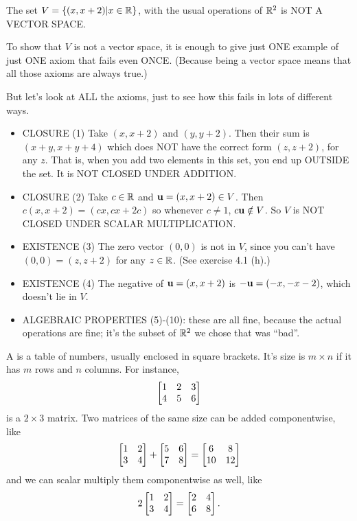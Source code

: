\begin{myexample} The set $V = \{(x,x+2) | x\in \mathbb{R}\}$, with the usual operations of $\mathbb{R}^2$ is NOT A VECTOR SPACE.

To show that $V$ is not a vector space, it is enough to give just ONE
example of just ONE axiom that fails even ONCE.  (Because being
a vector space means that all those axioms are always true.)

But let's look at ALL the axioms, just to see how this fails in 
lots of different ways.
\begin{itemize}
\item CLOSURE (1)  Take $(x,x+2)$ and $(y,y+2)$.  Then their sum is
$(x+y, x+y+4)$ which does NOT have the correct form $(z,z+2)$, for
any $z$.  That is, when you add two elements in this set, you end
up OUTSIDE the set.  It is NOT CLOSED UNDER ADDITION.
\item CLOSURE (2) Take $c\in \mathbb{R}$ and $\mathbf{u} = (x,x+2)\in V$.  Then $c(x,x+2) = (cx, cx+2c)$ so whenever $c\neq 1$, $c\mathbf{u} \notin V$.  So $V$ is
NOT CLOSED UNDER SCALAR MULTIPLICATION.
\item EXISTENCE (3) The zero vector $(0,0)$ is not in $V$, since 
you can't have $(0,0) = (z,z+2)$ for any $z\in \mathbb{R}$.  (See exercise 4.1 (h).)
\item EXISTENCE (4) The negative of $\mathbf{u} = (x,x+2)$ is $-\mathbf{u} = (-x,-x-2)$,
which doesn't lie in $V$.
\item ALGEBRAIC PROPERTIES (5)-(10): these are all fine, because the
actual operations are fine; it's the subset of $\mathbb{R}^2$ we chose 
that was ``bad''.
\end{itemize} \end{myexample}


\begin{definition}
A  is a table of numbers, usually enclosed in
square brackets.  It's size is $m \times n$ if it has $m$ rows and
$n$ columns.  For instance, 
$$\left[ \begin{matrix} 1 & 2 & 3 \\ 4 & 5 & 6 \end{matrix} \right]$$
is a $2 \times 3$ matrix.
Two matrices of the same size can be added componentwise, like
$$
\left[ \begin{matrix} 1 & 2 \\ 3 & 4 \end{matrix} \right] + \left[ \begin{matrix} 5 & 6 \\ 7 & 8 \end{matrix} \right] = \left[ \begin{matrix} 6 & 8 \\ 10 & 12 \end{matrix} \right]
$$
and we can scalar multiply them componentwise as well, like
$$
2\left[ \begin{matrix} 1 & 2 \\ 3 & 4 \end{matrix} \right] = \left[ \begin{matrix} 2 & 4 \\ 6 & 8 \end{matrix} \right].
$$
\end{definition}

